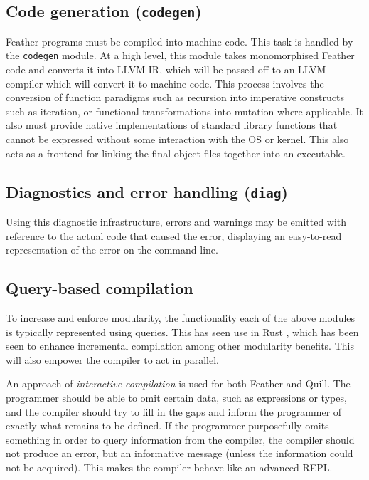 \documentclass[11pt]{book}
\begin{document}
\subsection{Code generation (\lstinline{codegen})}

Feather programs must be compiled into machine code.
This task is handled by the \lstinline{codegen} module.
At a high level, this module takes monomorphised Feather code and converts it into LLVM IR, which will be passed off to an LLVM compiler which will convert it to machine code.
This process involves the conversion of function paradigms such as recursion into imperative constructs such as iteration, or functional transformations into mutation where applicable.
It also must provide native implementations of standard library functions that cannot be expressed without some interaction with the OS or kernel.
This also acts as a frontend for linking the final object files together into an executable.

\subsection{Diagnostics and error handling (\lstinline{diag})}

Using this diagnostic infrastructure, errors and warnings may be emitted with reference to the actual code that caused the error, displaying an easy-to-read representation of the error on the command line.

\subsection{Query-based compilation}

To increase and enforce modularity, the functionality each of the above modules is typically represented using queries.
This has seen use in Rust \cite{RustDevGuideOverview}, which has been seen to enhance incremental compilation among other modularity benefits.
This will also empower the compiler to act in parallel.

An approach of \textit{interactive compilation} is used for both Feather and Quill.
The programmer should be able to omit certain data, such as expressions or types, and the compiler should try to fill in the gaps and inform the programmer of exactly what remains to be defined.
If the programmer purposefully omits something in order to query information from the compiler, the compiler should not produce an error, but an informative message (unless the information could not be acquired).
This makes the compiler behave like an advanced REPL.
\end{document}
